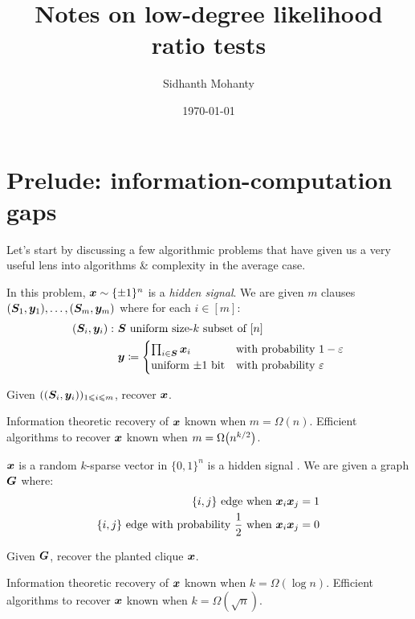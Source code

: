 \documentclass[11pt, letterpaper]{article}
\begin{document}
\title{Notes on low-degree likelihood ratio tests}
\author{Sidhanth Mohanty}
\date{\today}
\maketitle


\section{Prelude: information-computation gaps}
Let's start by discussing a few algorithmic problems that have given us a very useful lens into algorithms \& complexity in the average case.

\medskip
\begin{tcolorbox}[arc=3mm,colback=White,coltext=Black,boxrule=1pt]
In this problem, ${\boldsymbol{x}}\sim\{\pm1\}^n$ is a \emph{hidden signal}.
We are given $m$ clauses $(\boldsymbol{S}_1,\boldsymbol{y}_1),\dots,(\boldsymbol{S}_m,\boldsymbol{y}_m)$ where for each $i\in[m]$:
\begin{align*}
    (\boldsymbol{S}_i,\boldsymbol{y}_i):~ & \boldsymbol{S}\text{ uniform size-$k$ subset of }[n] \\
        & \boldsymbol{y}\coloneqq
        \begin{cases}
            \prod_{i\in\boldsymbol{S}} {\boldsymbol{x}}_i & \text{with probability }1-\varepsilon \\
            \text{uniform $\pm1$ bit} &\text{with probability }\varepsilon
        \end{cases}
\end{align*}

Given $((\boldsymbol{S}_i,\boldsymbol{y}_i))_{1\leqslant i\leqslant m}$, recover ${\boldsymbol{x}}$.

Information theoretic recovery of ${\boldsymbol{x}}$ known when $m = \Omega(n)$.
Efficient algorithms to recover ${\boldsymbol{x}}$ known when $m = \Omega\parens*{n^{k/2}}$.

\end{tcolorbox}

\medskip
\begin{tcolorbox}[arc=3mm,colback=White,coltext=Black,boxrule=1pt]
${\boldsymbol{x}}$ is a random $k$-sparse vector in $\{0,1\}^n$ is a hidden signal .
We are given a graph $\boldsymbol{G}$ where:
\begin{align*}
    \{i,j\}\text{ edge when }{\boldsymbol{x}}_i{\boldsymbol{x}}_j = 1 \\
    \{i,j\}\text{ edge with probability }\frac{1}{2}\text{ when }{\boldsymbol{x}}_i{\boldsymbol{x}}_j = 0
\end{align*}

Given $\boldsymbol{G}$, recover the planted clique ${\boldsymbol{x}}$.

Information theoretic recovery of ${\boldsymbol{x}}$ known when $k = \Omega(\log n)$.
Efficient algorithms to recover ${\boldsymbol{x}}$ known when $k = \Omega(\sqrt{n})$.

\end{tcolorbox}
\end{document}
